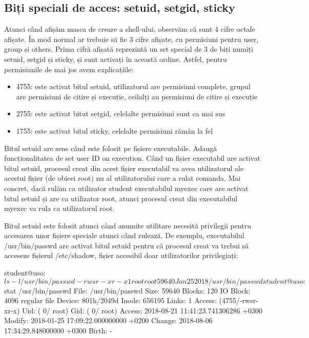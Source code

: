 \subsection{Biți speciali de acces: setuid, setgid, sticky}
\label{sec:users-fs-perms-special}

Atunci când afișăm masca de creare a shell-ului, observăm că sunt 4 cifre octale
afișate. În mod normal ar trebuie să fie 3 cifre afișate, cu permisiuni pentru
user, group și others. Prima cifră afișată reprezintă un set special de 3 de
biți numiți setuid, setgid și sticky, și sunt activați în această ordine.
Astfel, pentru permisiunile de mai jos avem explicațiile:

\begin{itemize}
	\item 4755: este activat bitul setuid, utilizatorul are permisiuni
		complete, grupul are permisiuni de citire și execuție, ceilalți
		au permisiuni de citire și execuție
	\item 2755: este activat bitut setgid, celelalte permisiuni sunt ca mai sus
	\item 1755: este activat bitul sticky, celelalte permisiuni rămân la fel
\end{itemize}

Bitul setuid are sens când este folosit pe fișiere executabile. Adaugă
funcționalitatea de set user ID on execution. Când un fișier executabil are
activat bitul setuid, procesul creat din acest fișier executabil va avea
utilizatorul ale acestui fișier (de obicei root) nu al utilizatorului care a
rulat comanda. Mai concret, dacă rulăm ca utilizator student executabilul myexec
care are activat bitul setuid și are ca utilizator root, atunci procesul creat
din executabilul myexec va rula ca utilizatorul root.

Bitul setuid este folosit atunci când anumite utilitare necesită privilegii
pentru accesarea unor fișiere speciale atunci când rulează. De exemplu,
executabilul /usr/bin/passwd are activat bitul setuid pentru că procesul creat
va trebui să acceseze fișierul /etc/shadow, fișier accesibil doar utilizatorilor
privilegiați:

\begin{screen}
student@uso:~$ ls -l /usr/bin/passwd
-rwsr-xr-x 1 root root 59640 Jan 25  2018 /usr/bin/passwd
student@uso:~$ stat /usr/bin/passwd
  File: /usr/bin/passwd
  Size: 59640             Blocks: 120        IO Block: 4096   regular file
Device: 801h/2049d        Inode: 656195      Links: 1
Access: (4755/-rwsr-xr-x)  Uid: (    0/    root)   Gid: (    0/    root)
Access: 2018-08-21 11:41:23.741306286 +0300
Modify: 2018-01-25 17:09:22.000000000 +0200
Change: 2018-08-06 17:34:29.848000000 +0300
 Birth: -
\end{screen}


